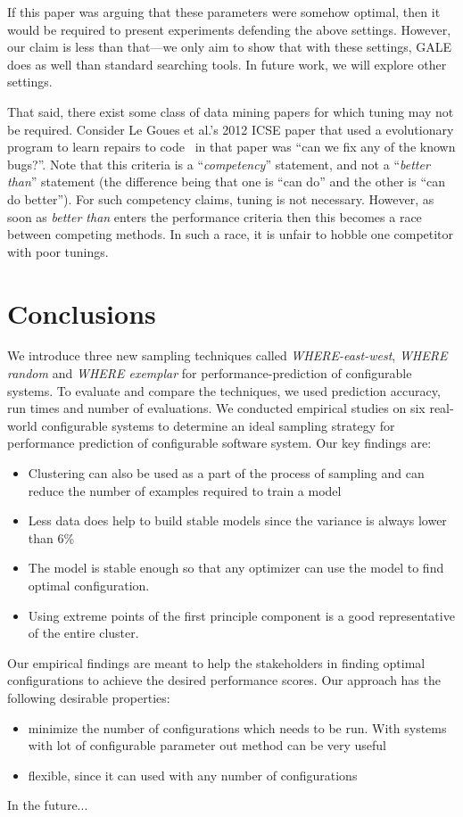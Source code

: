 \documentclass{sig-alternative}
\newcommand{\bi}{\begin{itemize}}%
\newcommand{\ei}{\end{itemize}}
\begin{document}
If this paper was arguing that these parameters were
somehow optimal, then it would be required to present
experiments defending the above settings. However, our
claim is less than that—we only aim to show that with
these settings, GALE does as well than standard searching
tools. In future work, we will explore other settings.




That said, there exist some class of data mining papers for which
tuning may not be required. Consider  Le Goues et al.'s 2012
ICSE paper that used a evolutionary program to learn
repairs to code~
in that paper was ``can we fix any of the known bugs?''. Note
that this criteria is a ``{\em competency}'' statement, and
not a ``{\em better than}'' statement (the difference being that
one is 
``can do'' and the other is ``can do better''). For such
competency claims, tuning is not necessary. However, as soon
as {\em better than} enters the performance criteria then this
becomes a race between competing methods. In such a race,
it is unfair to hobble one competitor with poor tunings.



\section{Conclusions}

We introduce three new sampling techniques called \textit{WHERE-east-west}, \textit{WHERE random} and \textit{WHERE exemplar} for performance-prediction of configurable systems. To evaluate and compare the techniques, we used prediction accuracy, run times and number of evaluations. We conducted empirical studies on six real-world configurable systems to determine an ideal sampling strategy for performance prediction of configurable software system. Our key findings are:
\bi
    \item{Clustering can also be used as a part of the process of sampling and can reduce the number of examples required to train a model}
    \item{Less data does help to build stable models since the variance is always lower than 6\%}
    \item{The model is stable enough so that any optimizer can use the model to find optimal configuration.}
    \item{Using extreme points of the first principle component is a good representative of the entire cluster.}
\ei

Our empirical findings are meant to help the stakeholders in finding optimal configurations to achieve the desired performance scores. Our approach has the following desirable properties:
\bi
\item{minimize the number of configurations which needs to be run. With systems with lot of configurable parameter out method can be very useful}
\item{flexible, since it can used with any number of configurations}
\ei
In the future...
\end{document}
